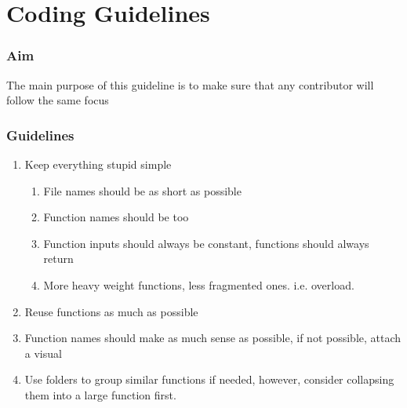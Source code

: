 \part{Coding Guidelines}

\section{Aim}
The main purpose of this guideline is to make sure that any contributor will follow the same focus

\section{Guidelines}
\begin{enumerate}
	\item Keep everything stupid simple
	\begin{enumerate}
		\item File names should be as short as possible
		\item Function names should be too
		\item Function inputs should always be constant, functions should always return
		\item More heavy weight functions, less fragmented ones. i.e. overload.
	\end{enumerate}
	\item Reuse functions as much as possible
	\item Function names should make as much sense as possible, if not possible, attach a visual
	\item Use folders to group similar functions if needed, however, consider collapsing them into a large function first.
\end{enumerate}


